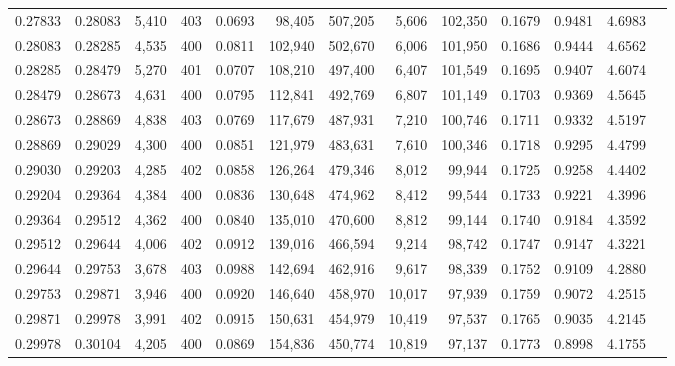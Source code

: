 \begin{tabular}{rrrrrrrrrrrrr}
0.27833 & 0.28083 &  5,410 & 403 &                                     0.0693 &  98,405 & 507,205 &   5,606 & 102,350 & 0.1679 & 0.9481 & 4.6983 \\
0.28083 & 0.28285 &  4,535 & 400 &                                     0.0811 & 102,940 & 502,670 &   6,006 & 101,950 & 0.1686 & 0.9444 & 4.6562 \\
0.28285 & 0.28479 &  5,270 & 401 &                                     0.0707 & 108,210 & 497,400 &   6,407 & 101,549 & 0.1695 & 0.9407 & 4.6074 \\
0.28479 & 0.28673 &  4,631 & 400 &                                     0.0795 & 112,841 & 492,769 &   6,807 & 101,149 & 0.1703 & 0.9369 & 4.5645 \\
0.28673 & 0.28869 &  4,838 & 403 &                                     0.0769 & 117,679 & 487,931 &   7,210 & 100,746 & 0.1711 & 0.9332 & 4.5197 \\
0.28869 & 0.29029 &  4,300 & 400 &                                     0.0851 & 121,979 & 483,631 &   7,610 & 100,346 & 0.1718 & 0.9295 & 4.4799 \\
0.29030 & 0.29203 &  4,285 & 402 &                                     0.0858 & 126,264 & 479,346 &   8,012 &  99,944 & 0.1725 & 0.9258 & 4.4402 \\
0.29204 & 0.29364 &  4,384 & 400 &                                     0.0836 & 130,648 & 474,962 &   8,412 &  99,544 & 0.1733 & 0.9221 & 4.3996 \\
0.29364 & 0.29512 &  4,362 & 400 &                                     0.0840 & 135,010 & 470,600 &   8,812 &  99,144 & 0.1740 & 0.9184 & 4.3592 \\
0.29512 & 0.29644 &  4,006 & 402 &                                     0.0912 & 139,016 & 466,594 &   9,214 &  98,742 & 0.1747 & 0.9147 & 4.3221 \\
0.29644 & 0.29753 &  3,678 & 403 &                                     0.0988 & 142,694 & 462,916 &   9,617 &  98,339 & 0.1752 & 0.9109 & 4.2880 \\
0.29753 & 0.29871 &  3,946 & 400 &                                     0.0920 & 146,640 & 458,970 &  10,017 &  97,939 & 0.1759 & 0.9072 & 4.2515 \\
0.29871 & 0.29978 &  3,991 & 402 &                                     0.0915 & 150,631 & 454,979 &  10,419 &  97,537 & 0.1765 & 0.9035 & 4.2145 \\
0.29978 & 0.30104 &  4,205 & 400 &                                     0.0869 & 154,836 & 450,774 &  10,819 &  97,137 & 0.1773 & 0.8998 & 4.1755 \\

\end{tabular}
